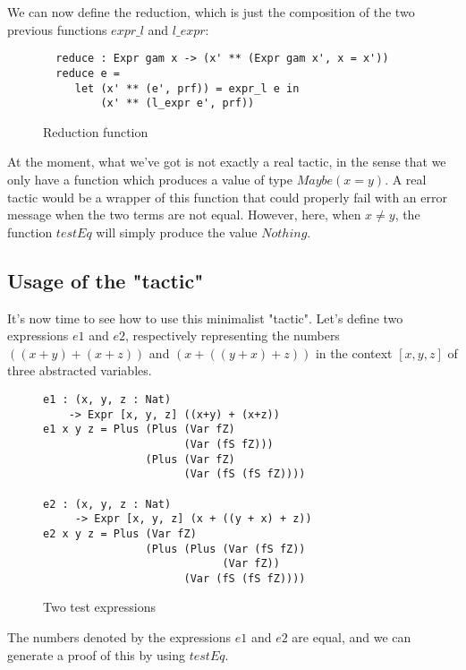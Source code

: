 We can now define the reduction, which is just the composition of the two previous functions $expr\_l$ and $l\_expr$:

\begin{figure}[H]
\figrule
\begin{center}
\begin{verbatim}
  reduce : Expr gam x -> (x' ** (Expr gam x', x = x'))
  reduce e = 
     let (x' ** (e', prf)) = expr_l e in
         (x' ** (l_expr e', prf))
\end{verbatim}
\end{center}
\caption{Reduction function}
\figrule
\end{figure}


At the moment, what we've got is not exactly a real tactic, in the sense that we only have a function which produces a value of type $Maybe (x = y)$. A real tactic would be a wrapper of this function that could properly fail with an error message when the two terms are not equal. However, here, when $x\ne y$, the function $testEq$ will simply produce the value $Nothing$. \\

\subsection{Usage of the "tactic"}

It's now time to see how to use this minimalist "tactic".
Let's define two expressions $e1$ and $e2$, respectively representing the numbers $((x + y) + (x + z))$ and $(x + ((y + x) + z))$ in the context $[x, y, z]$ of three abstracted variables.


\begin{figure}[H]
\figrule
\begin{center}
\begin{verbatim}
e1 : (x, y, z : Nat) 
    -> Expr [x, y, z] ((x+y) + (x+z))
e1 x y z = Plus (Plus (Var fZ) 
                      (Var (fS fZ))) 
                (Plus (Var fZ) 
                      (Var (fS (fS fZ))))

e2 : (x, y, z : Nat) 
     -> Expr [x, y, z] (x + ((y + x) + z))
e2 x y z = Plus (Var fZ) 
                (Plus (Plus (Var (fS fZ)) 
                            (Var fZ)) 
                      (Var (fS (fS fZ))))
\end{verbatim}
\end{center}
\caption{Two test expressions}
\figrule
\end{figure}

The numbers denoted by the expressions $e1$ and $e2$ are equal, and we can generate a proof of this by using $testEq$.

